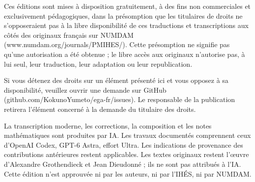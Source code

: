 \documentclass[11pt,a4paper]{article}
\begin{document}
Ces éditions sont mises à disposition gratuitement, à des fins non commerciales et exclusivement pédagogiques, dans la présomption que les titulaires de droits ne s'opposeraient pas à la libre disponibilité de ces traductions et transcriptions aux côtés des originaux français sur NUMDAM (www.numdam.org/journals/PMIHES/). Cette présomption ne signifie pas qu'une autorisation a été obtenue ; le libre accès aux originaux n'autorise pas, à lui seul, leur traduction, leur adaptation ou leur republication.

Si vous détenez des droits sur un élément présenté ici et vous opposez à sa disponibilité, veuillez ouvrir une demande sur GitHub (github.com/KokunoYumeto/ega-fr/issues). Le responsable de la publication retirera l'élément concerné à la demande du titulaire des droits.

La transcription moderne, les corrections, la composition et les notes mathématiques sont produites par IA. Les travaux documentés comprennent ceux d'OpenAI Codex, GPT-6 Astra, effort Ultra. Les indications de provenance des contributions antérieures restent applicables. Les textes originaux restent l'œuvre d'Alexandre Grothendieck et Jean Dieudonné ; ils ne sont pas attribués à l'IA. Cette édition n'est approuvée ni par les auteurs, ni par l'IHÉS, ni par NUMDAM.
\par
\endgroup
\clearpage
\end{document}
